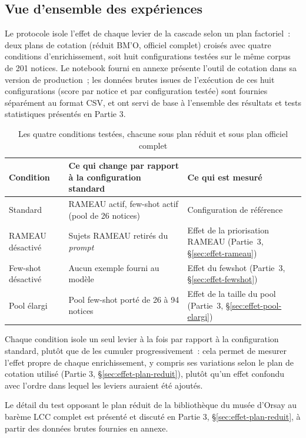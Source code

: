 \subsection{Vue d'ensemble des expériences}
\label{sec:vue-ensemble-experiences}

Le protocole isole l'effet de chaque levier de la cascade selon un plan factoriel~: deux plans de cotation (réduit BM'O, officiel complet) croisés avec quatre conditions d'enrichissement, soit huit configurations testées sur le même corpus de 201 notices. Le notebook fourni en annexe présente l'outil de cotation dans sa version de production~; les données brutes issues de l'exécution de ces huit configurations (score par notice et par configuration testée) sont fournies séparément au format CSV, et ont servi de base à l'ensemble des résultats et tests statistiques présentés en Partie 3.

\begin{table}[h]
\centering
\small
\setlength{\tabcolsep}{4pt}
\renewcommand{\arraystretch}{1.15}
\begin{tabular}{@{}p{}p{}p{}@{}}
\toprule
\textbf{Condition} & \textbf{Ce qui change par rapport à la configuration standard} & \textbf{Ce qui est mesuré} \\
\midrule
Standard           & RAMEAU actif, few-shot actif (pool de 26 notices) & Configuration de référence \\
RAMEAU désactivé   & Sujets RAMEAU retirés du \textit{prompt}          & Effet de la priorisation RAMEAU (Partie~3, \S\ref{sec:effet-rameau}) \\
Few-shot désactivé & Aucun exemple fourni au modèle                    & Effet du \gls{fewshot} (Partie~3, \S\ref{sec:effet-fewshot}) \\
Pool élargi        & Pool few-shot porté de 26 à 94 notices            & Effet de la taille du pool (Partie~3, \S\ref{sec:effet-pool-elargi}) \\
\bottomrule
\end{tabular}
\caption{Les quatre conditions testées, chacune sous plan réduit et sous plan officiel complet}
\label{tab:experiences}
\end{table}


Chaque condition isole un seul levier à la fois par rapport à la configuration standard, plutôt que de les cumuler progressivement~: cela permet de mesurer l'effet propre de chaque enrichissement, y compris ses variations selon le plan de cotation utilisé (Partie 3, \S\ref{sec:effet-plan-reduit}), plutôt qu'un effet confondu avec l'ordre dans lequel les leviers auraient été ajoutés.

Le détail du test opposant le plan réduit de la bibliothèque du musée d'Orsay au barème LCC complet est présenté et discuté en Partie 3, \S\ref{sec:effet-plan-reduit}, à partir des données brutes fournies en annexe.